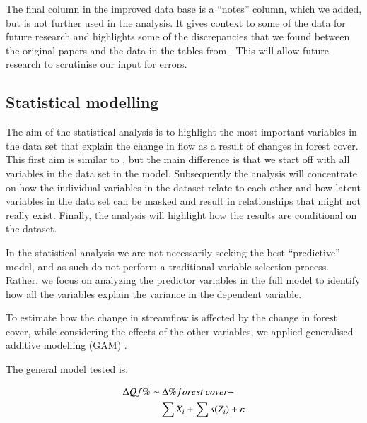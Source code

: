 \documentclass[]{elsarticle} %
\begin{document}
The final column in the improved data base is a ``notes'' column, which we added, but is not further used in the analysis. It gives context to some of the data for future research and highlights some of the discrepancies that we found between the original papers and the data in the tables from \citet{zhang2017}. This will allow future research to scrutinise our input for errors.

\hypertarget{statistical-modelling}{%
\subsection{Statistical modelling}\label{statistical-modelling}}

The aim of the statistical analysis is to highlight the most important variables in the data set that explain the change in flow as a result of changes in forest cover. This first aim is similar to \citet{zhang2017}, but the main difference is that we start off with all variables in the data set in the model. Subsequently the analysis will concentrate on how the individual variables in the dataset relate to each other and how latent variables in the data set can be masked and result in relationships that might not really exist. Finally, the analysis will highlight how the results are conditional on the dataset.

In the statistical analysis we are not necessarily seeking the best ``predictive'' model, and as such do not perform a traditional variable selection process. Rather, we focus on analyzing the predictor variables in the full model to identify how all the variables explain the variance in the dependent variable.

To estimate how the change in streamflow is affected by the change in forest cover, while considering the effects of the other variables, we applied generalised additive modelling (GAM) \citep{wood2006}.

The general model tested is:

\begin{align}
\Delta Qf \% \sim &~ \Delta \% forest~cover + \notag \\ 
& \sum{X_i} + \sum{s(Z_i)} + \varepsilon \label{eq:eq2}
\end{align}
\end{document}
